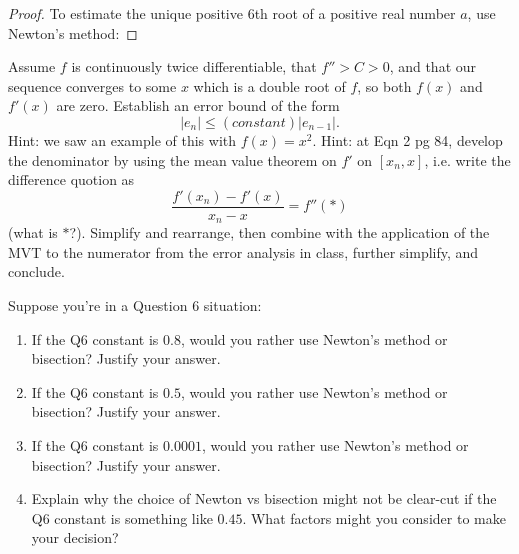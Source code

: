 \documentclass{article}
\begin{document}
\begin{proof}
    To estimate the unique positive \(6\)th root of a positive real number \(a\), use Newton's method:
\end{proof}

\begin{problem}
     Assume \(f\) is continuously twice differentiable, that \(f'' >C>0\), and that our sequence converges to some \(x\) which is a double root of \(f\), so both \(f(x)\) and \(f'(x)\) are zero. Establish an error bound of the form
    \[|e_n| \leq (constant) |e_{n-1}|.\]
    Hint: we saw an example of this with \(f(x) = x^2\). Hint: at Eqn 2 pg 84, develop the denominator by using the mean value theorem on \(f'\) on \([x_n,x]\), i.e. write the difference quotion as
    \[\frac{f'(x_n) - f'(x)}{x_n-x} = f''(*)\]
    (what is \(*\)?). Simplify and rearrange, then combine with the application of the MVT to the numerator from the error analysis in class, further simplify, and conclude.
\end{problem}

\begin{problem}
    Suppose you're in a Question 6 situation:
    \begin{enumerate}
        \item If the Q6 constant is \(0.8\), would you rather use Newton's method or bisection? Justify your answer.
        \item If the Q6 constant is \(0.5\), would you rather use Newton's method or bisection? Justify your answer.
        \item If the Q6 constant is \(0.0001\), would you rather use Newton's method or bisection? Justify your answer.
        \item Explain why the choice of Newton vs bisection might not be clear-cut if the Q6 constant is something like \(0.45\). What factors might you consider to make your decision?
    \end{enumerate}

\end{problem}
\end{document}
